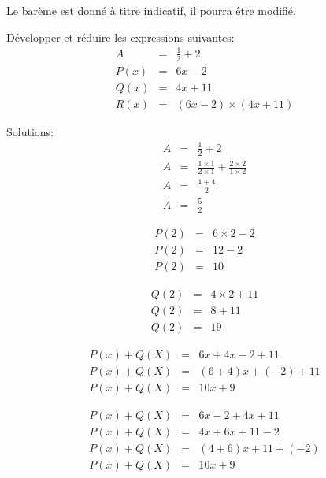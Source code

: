\documentclass[a4paper,10pt]{/media/documents/Cours/Prof/Enseignements/Archive/2013-2014/tools/style/classDS}
\date{26 septemble 2013}
\begin{document}
\maketitle

\Calc
Le barème est donné à titre indicatif, il pourra être modifié.

\begin{Exo}[4.5]
    
    
    
    
		Développer et réduire les expressions suivantes:
            \begin{eqnarray*}
                A &=& \frac{ 1 }{ 2 } + 2 \\
                P(x) &=& 6 x - 2 \\
                Q(x) &=& 4 x + 11\\
                R(x) &=& ( 6 x - 2 ) \times ( 4 x + 11 ) 
            \end{eqnarray*}

        Solutions:
        \begin{eqnarray*}
A & = & \frac{ 1 }{ 2 } + 2 \\ 
A & = & \frac{ 1 \times 1 }{ 2 \times 1 } + \frac{ 2 \times 2 }{ 1 \times 2 } \\ 
A & = & \frac{ 1 + 4 }{ 2 } \\ 
A & = & \frac{ 5 }{ 2 }
\end{eqnarray*}

        \begin{eqnarray*}
P(2) & = & 6 \times 2 - 2 \\ 
P(2) & = & 12 - 2 \\ 
P(2) & = & 10
\end{eqnarray*}

        \begin{eqnarray*}
Q(2) & = & 4 \times 2 + 11 \\ 
Q(2) & = & 8 + 11 \\ 
Q(2) & = & 19
\end{eqnarray*}

        \begin{eqnarray*}
P(x) + Q(X) & = & 6 x + 4 x - 2 + 11 \\ 
P(x) + Q(X) & = & ( 6 + 4 ) x + ( -2 ) + 11 \\ 
P(x) + Q(X) & = & 10 x + 9
\end{eqnarray*}

        \begin{eqnarray*}
P(x) + Q(X) & = & 6 x - 2 + 4 x + 11 \\ 
P(x) + Q(X) & = & 4 x + 6 x + 11 - 2 \\ 
P(x) + Q(X) & = & ( 4 + 6 ) x + 11 + ( -2 ) \\ 
P(x) + Q(X) & = & 10 x + 9
\end{eqnarray*}


\end{Exo}
\end{document}
